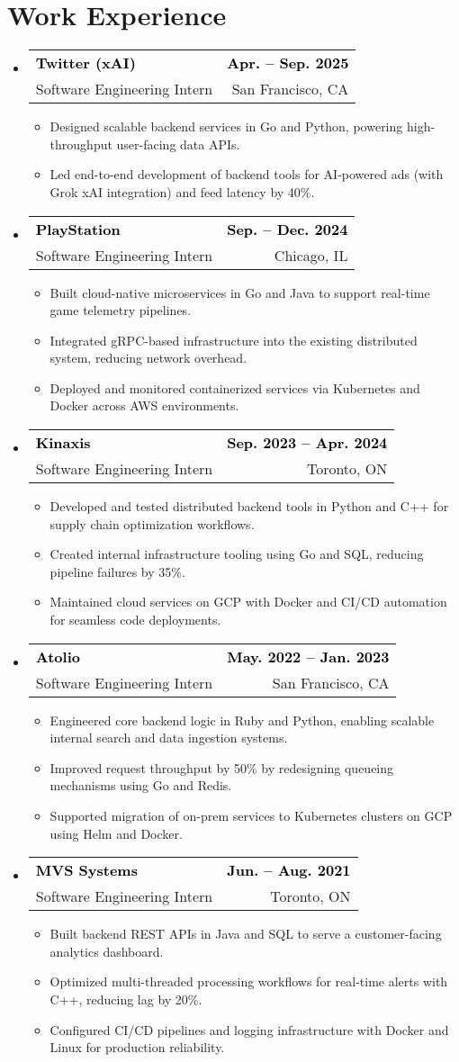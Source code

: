 \documentclass[letterpaper,11pt]{article}
\makeatletter
\newcommand\boldblack[1]{\textcolor{black}{\textbf{#1}}}
\newcommand{\resumeItem}[1]{
  \item\small{
    {#1 \vspace{-2pt}}
  }
}
\newcommand{\resumeSubheading}[4]{
  \vspace{-2pt}\item
    \begin{tabular*}{1.0\textwidth}[t]{l@{\extracolsep{\fill}}r}
      \boldblack{#1} & \boldblack{\small #2} \\
      \small#3 & \small #4 \\
    \end{tabular*}\vspace{-7pt}
}
\newcommand{\resumeSubHeadingListStart}{\begin{itemize}[leftmargin=0.0in, label={}]}
\newcommand{\resumeSubHeadingListEnd}{\end{itemize}}
\newcommand{\resumeItemListStart}{\begin{itemize}}
\newcommand{\resumeItemListEnd}{\end{itemize}\vspace{-5pt}}
\makeatother
\begin{document}
\section{Work Experience}
\vspace{2pt}
  \resumeSubHeadingListStart
  \resumeSubheading
        {Twitter (xAI)}{Apr. -- Sep. 2025}
      {Software Engineering Intern}{San Francisco, CA} 
      \resumeItemListStart
        \resumeItem{Designed scalable backend services in Go and Python, powering high-throughput user-facing data APIs.}
        \resumeItem{Led end-to-end development of backend tools for AI-powered ads (with Grok xAI integration) and feed latency by 40\%.}
      \resumeItemListEnd
      
    \resumeSubheading
        {PlayStation}{Sep. -- Dec. 2024}
      {Software Engineering Intern}{Chicago, IL} 
      \resumeItemListStart
        \resumeItem{Built cloud-native microservices in Go and Java to support real-time game telemetry pipelines.}
        \resumeItem{Integrated gRPC-based infrastructure into the existing distributed system, reducing network overhead.}
        \resumeItem{Deployed and monitored containerized services via Kubernetes and Docker across AWS environments.}
      \resumeItemListEnd

    \resumeSubheading
        {Kinaxis}{Sep. 2023 -- Apr. 2024}
      {Software Engineering Intern}{Toronto, ON}
      \resumeItemListStart
        \resumeItem{Developed and tested distributed backend tools in Python and C++ for supply chain optimization workflows.}
        \resumeItem{Created internal infrastructure tooling using Go and SQL, reducing pipeline failures by 35\%.}
        \resumeItem{Maintained cloud services on GCP with Docker and CI/CD automation for seamless code deployments.}
      \resumeItemListEnd
    
    \resumeSubheading
        {Atolio}{May. 2022 -- Jan. 2023}
      {Software Engineering Intern}{San Francisco, CA}
      \resumeItemListStart
        \resumeItem{Engineered core backend logic in Ruby and Python, enabling scalable internal search and data ingestion systems.}
        \resumeItem{Improved request throughput by 50\% by redesigning queueing mechanisms using Go and Redis.}
        \resumeItem{Supported migration of on-prem services to Kubernetes clusters on GCP using Helm and Docker.}
      \resumeItemListEnd
    
    \resumeSubheading
        {MVS Systems}{Jun. -- Aug. 2021}
      {Software Engineering Intern}{Toronto, ON} 
      \resumeItemListStart
        \resumeItem{Built backend REST APIs in Java and SQL to serve a customer-facing analytics dashboard.}
        \resumeItem{Optimized multi-threaded processing workflows for real-time alerts with C++, reducing lag by 20\%.}
        \resumeItem{Configured CI/CD pipelines and logging infrastructure with Docker and Linux for production reliability.}
      \resumeItemListEnd
  \resumeSubHeadingListEnd
\end{document}
